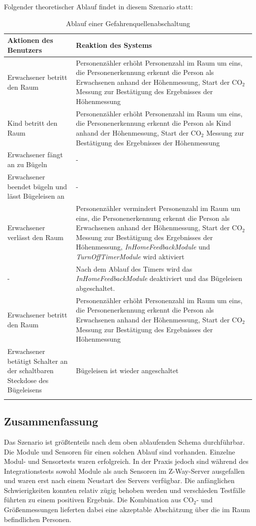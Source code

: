 Folgender theoretischer Ablauf findet in diesem Szenario statt:
\begin{longtabu} to 
	\hline
	\textbf{Aktionen des Benutzers}									& \textbf{Reaktion des Systems} \\
	\hline
	\endhead
	Erwachsener betritt den Raum	& Personenzähler erhöht Personenzahl im Raum um eins, die Personenerkennung erkennt die Person als Erwachsenen anhand der Höhenmessung, Start der CO$_2$ Messung zur Bestätigung des Ergebnisses der Höhenmessung \\
	\hline
	Kind betritt den Raum	& Personenzähler erhöht Personenzahl im Raum um eins, die Personenerkennung erkennt die Person als Kind anhand der Höhenmessung, Start der CO$_2$ Messung zur Bestätigung des Ergebnisses der Höhenmessung \\
	\hline
	Erwachsener fängt an zu Bügeln	& - \\
	\hline
	Erwachsener beendet bügeln und lässt Bügeleisen an	& - \\
	\hline
	Erwachsener verlässt den Raum	& Personenzähler vermindert Personenzahl im Raum um eins, die Personenerkennung erkennt die Person als Erwachsenen anhand der Höhenmessung, Start der CO$_2$ Messung zur Bestätigung des Ergebnisses der Höhenmessung, \emph{InHomeFeedbackModule} und \emph{TurnOffTimerModule} wird aktiviert \\
	\hline
	-	& Nach dem Ablauf des Timers wird das \emph{InHomeFeedbackModule} deaktiviert und das Bügeleisen abgeschaltet. \\
	\hline
	Erwachsener betritt den Raum	& Personenzähler erhöht Personenzahl im Raum um eins, die Personenerkennung erkennt die Person als Erwachsenen anhand der Höhenmessung, Start der CO$_2$ Messung zur Bestätigung des Ergebnisses der Höhenmessung \\
	\hline
	Erwachsener betätigt Schalter an der schaltbaren Steckdose des Bügeleisens 	& Bügeleisen ist wieder angeschaltet \\
	\hline
	\caption{Ablauf einer Gefahrenquellenabschaltung}
\end{longtabu}


\subsection{Zusammenfassung}
Das Szenario ist größtenteils nach dem oben ablaufenden Schema durchführbar. Die Module und Sensoren für einen solchen Ablauf sind vorhanden. Einzelne Modul- und Sensortests waren erfolgreich. In der Praxis jedoch sind während des Integrationstests sowohl Module als auch Sensoren im Z-Way-Server ausgefallen und waren erst nach einem Neustart des Servers verfügbar. Die anfänglichen Schwierigkeiten konnten relativ zügig behoben werden und verschieden Testfälle führten zu einem positiven Ergebnis. Die Kombination aus CO$_2$- und Größenmessungen lieferten dabei eine akzeptable Abschätzung über die im Raum befindlichen Personen.


